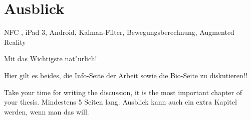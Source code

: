 \chapter{Ausblick}
  \label{Ausblick}

NFC \cite{wiki:006}, iPad 3, Android, Kalman-Filter, Bewegungsberechnung, Augmented Reality

Mit das Wichtigste nat"urlich!

Hier gilt es beides, die Info-Seite der Arbeit sowie die Bio-Seite zu diskutieren!!

Take your time for writing the discussion, it is the most important chapter of your thesis.
\clearpage
Mindestens 5 Seiten lang.
\clearpage
Ausblick kann auch ein extra Kapitel werden, wenn man das will.